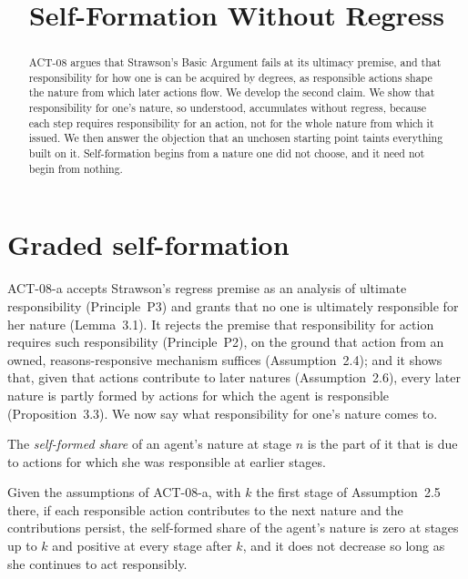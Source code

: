 \documentclass{situationist-preprint}
\title{Self-Formation Without Regress}
\begin{document}
\maketitle

\begin{abstract}
ACT-08 argues that Strawson's Basic Argument fails at its ultimacy premise, and that responsibility for how one is can be acquired by degrees, as responsible actions shape the nature from which later actions flow. We develop the second claim. We show that responsibility for one's nature, so understood, accumulates without regress, because each step requires responsibility for an action, not for the whole nature from which it issued. We then answer the objection that an unchosen starting point taints everything built on it. Self-formation begins from a nature one did not choose, and it need not begin from nothing.
\end{abstract}

\section{Graded self-formation}

ACT-08-a accepts Strawson's regress premise as an analysis of ultimate responsibility (Principle~P3) and grants that no one is ultimately responsible for her nature (Lemma~3.1). It rejects the premise that responsibility for action requires such responsibility (Principle~P2), on the ground that action from an owned, reasons-responsive mechanism suffices (Assumption~2.4); and it shows that, given that actions contribute to later natures (Assumption~2.6), every later nature is partly formed by actions for which the agent is responsible (Proposition~3.3). We now say what responsibility for one's nature comes to.

\begin{definition}\label{d:share}
The \emph{self-formed share} of an agent's nature at stage $n$ is the part of it that is due to actions for which she was responsible at earlier stages.
\end{definition}

\begin{proposition}\label{p:accum}
Given the assumptions of ACT-08-a, with $k$ the first stage of Assumption~2.5 there, if each responsible action contributes to the next nature and the contributions persist, the self-formed share of the agent's nature is zero at stages up to $k$ and positive at every stage after $k$, and it does not decrease so long as she continues to act responsibly.
\end{proposition}
\end{document}
